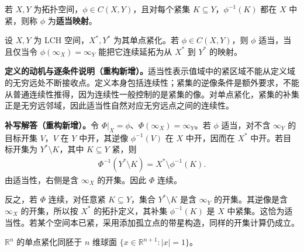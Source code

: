 \documentclass[../../main.tex]{subfiles}%
\begin{document}
\begin{exercise}\label{exercise:ch04-proper-maps}
\begin{definition*}[适当映射]\label{definition:ch04-proper-map}
若 $X,Y$ 为拓扑空间，$\phi\in C(X,Y)$，且对每个紧集 $K\subseteq Y$，$\phi^{-1}(K)$ 都在 $X$ 中紧，则称 $\phi$ 为\textbf{适当映射}。
\end{definition*}
设 $X,Y$ 为 LCH 空间，$X^*,Y^*$ 为其单点紧化。若 $\phi\in C(X,Y)$，则 $\phi$ 适当，当且仅当令 $\phi(\infty_X)=\infty_Y$ 能把它连续延拓为从 $X^*$ 到 $Y^*$ 的映射。
\end{exercise}
\begin{remark}
\textbf{定义的动机与逐条件说明（重构新增）。}适当性表示值域中的紧区域不能从定义域的无穷远处不断接收点。定义本身包括连续性；紧集的逆像条件是额外要求，不能从普通连续性推得，因为连续性一般控制的是紧集的像。对单点紧化，紧集的补集正是无穷远邻域，因此适当性自然对应无穷远点之间的连续性。
\end{remark}
\begin{solution}
\textbf{补写解答（重构新增）。}令 $\Phi|_X=\phi$、$\Phi(\infty_X)=\infty_Y$。若 $\phi$ 适当，对不含 $\infty_Y$ 的目标开集 $V$，$V$ 在 $Y$ 中开，其逆像 $\phi^{-1}(V)$ 在 $X$ 中开，因而在 $X^*$ 中开。若目标开集为 $Y^*\setminus K$，其中 $K\subseteq Y$ 紧，则
\begin{align*}
\Phi^{-1}(Y^*\setminus K)=X^*\setminus\phi^{-1}(K).
\end{align*}
由适当性，右侧是含 $\infty_X$ 的开集。因此 $\Phi$ 连续。

反之，若 $\Phi$ 连续，对任意紧 $K\subseteq Y$，集合 $Y^*\setminus K$ 是含 $\infty_Y$ 的开集。其逆像是含 $\infty_X$ 的开集，所以按 $X^*$ 的拓扑定义，其补集 $\phi^{-1}(K)$ 是 $X$ 中紧集。这恰为适当性。若某个空间本已紧，采用添加孤立点的带星构造，同样的开集计算仍成立。
\end{solution}
\begin{exercise}\label{exercise:ch04-sphere-compactification}
$\mathbb R^n$ 的单点紧化同胚于 $n$ 维球面 $\{x\in\mathbb R^{n+1}:|x|=1\}$。
\end{exercise}
\end{document}
